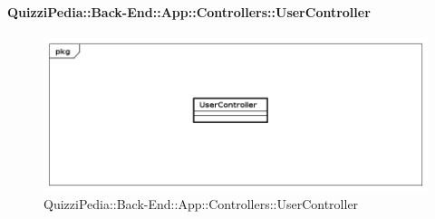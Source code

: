 \paragraph{QuizziPedia::Back-End::App::Controllers::UserController}
\label{QuizziPedia::Back-End::App::Controllers::UserController}
\begin{figure}[ht]
	\centering
	\includegraphics[scale=0.45]{UML/Classi/Back-End/QuizziPedia_Back-End_App_Controllers_UserController.png}
	\caption{QuizziPedia::Back-End::App::Controllers::UserController}
\end{figure}
\FloatBarrier
